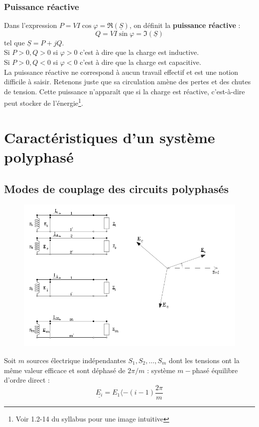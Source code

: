 		\subsubsection{Puissance réactive}
		Dans l'expression $P = VI \cos\varphi = \Re(\underline{S})$, on définit la 
		\textbf{puissance réactive} :
		\begin{equation}
		Q = VI\sin\varphi = \Im(\underline{S})
		\end{equation}
		tel que $\underline{S} = P+jQ$.\\
		Si $P>0, Q>0$ si $\varphi>0$ c'est à dire que la charge est inductive.\\
		Si $P>0, Q<0$ si $\varphi<0$ c'est à dire que la charge est capacitive.\\
			
		La puissance réactive ne correspond à aucun travail effectif et est une 
		notion difficile à saisir. Retenons juste que sa circulation amène des 
		pertes et des chutes de tension. Cette puissance n'apparaît que si la 
		charge est réactive, c'est-à-dire peut stocker de l'énergie\footnote{Voir 
		1.2-14 du syllabus pour une image intuitive}.
\newpage		
\section{Caractéristiques d'un système polyphasé}
	\subsection{Modes de couplage des circuits polyphasés}
		\begin{figure}
	\vspace{-8mm}
	\includegraphics[scale=0.34]{ch1/image5.png}
	\end{figure}	
	Soit $m$ sources électrique indépendantes $S_1, S_2,\dots,S_m$ dont les tensions 
	ont la même valeur efficace et sont déphasé de $2\pi/m$ : système $m-$phasé 
	équilibre d'ordre direct :
	\begin{equation}
	\underline{E_i} = E_{1} \langle -(i-1)\frac{2\pi}{m}
	\end{equation}


